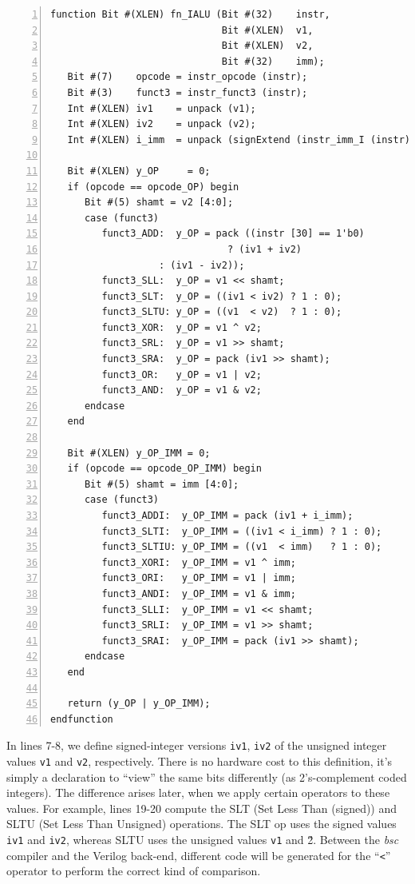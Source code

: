 {\small
\begin{Verbatim}[frame=single, numbers=left]
function Bit #(XLEN) fn_IALU (Bit #(32)    instr,
                              Bit #(XLEN)  v1,
                              Bit #(XLEN)  v2,
                              Bit #(32)    imm);
   Bit #(7)    opcode = instr_opcode (instr);
   Bit #(3)    funct3 = instr_funct3 (instr);
   Int #(XLEN) iv1    = unpack (v1);
   Int #(XLEN) iv2    = unpack (v2);
   Int #(XLEN) i_imm  = unpack (signExtend (instr_imm_I (instr)));

   Bit #(XLEN) y_OP     = 0;
   if (opcode == opcode_OP) begin
      Bit #(5) shamt = v2 [4:0];
      case (funct3)
         funct3_ADD:  y_OP = pack ((instr [30] == 1'b0)
	                           ? (iv1 + iv2)
				   : (iv1 - iv2));
         funct3_SLL:  y_OP = v1 << shamt;
         funct3_SLT:  y_OP = ((iv1 < iv2) ? 1 : 0);
         funct3_SLTU: y_OP = ((v1  < v2)  ? 1 : 0);
         funct3_XOR:  y_OP = v1 ^ v2;
         funct3_SRL:  y_OP = v1 >> shamt;
         funct3_SRA:  y_OP = pack (iv1 >> shamt);
         funct3_OR:   y_OP = v1 | v2;
         funct3_AND:  y_OP = v1 & v2;
      endcase
   end

   Bit #(XLEN) y_OP_IMM = 0;
   if (opcode == opcode_OP_IMM) begin
      Bit #(5) shamt = imm [4:0];
      case (funct3)
         funct3_ADDI:  y_OP_IMM = pack (iv1 + i_imm);
         funct3_SLTI:  y_OP_IMM = ((iv1 < i_imm) ? 1 : 0);
         funct3_SLTIU: y_OP_IMM = ((v1  < imm)   ? 1 : 0);
         funct3_XORI:  y_OP_IMM = v1 ^ imm;
         funct3_ORI:   y_OP_IMM = v1 | imm;
         funct3_ANDI:  y_OP_IMM = v1 & imm;
         funct3_SLLI:  y_OP_IMM = v1 << shamt;
         funct3_SRLI:  y_OP_IMM = v1 >> shamt;
         funct3_SRAI:  y_OP_IMM = pack (iv1 >> shamt);
      endcase
   end

   return (y_OP | y_OP_IMM);
endfunction
\end{Verbatim}
}

In lines 7-8, we define signed-integer versions {\tt iv1}, {\tt iv2}
of the unsigned integer values {\tt v1} and {\tt v2}, respectively.
There is no hardware cost to this definition, it's simply a
declaration to ``view'' the same bits differently (as 2's-complement
coded integers).  The difference arises later, when we apply certain
operators to these values.  For example, lines 19-20 compute the SLT
(Set Less Than (signed)) and SLTU (Set Less Than Unsigned) operations.
The SLT op uses the signed values {\tt iv1} and {\tt iv2}, whereas
SLTU uses the unsigned values {\tt v1} and {\v2}.  Between the
\emph{bsc} compiler and the Verilog back-end, different code will be
generated for the ``{\tt <}'' operator to perform the correct kind of
comparison.

